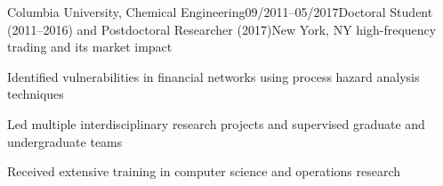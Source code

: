 \begin{rSubsection}{Columbia University, Chemical Engineering}{09/2011--05/2017}{Doctoral Student (2011--2016) and Postdoctoral Researcher (2017)}{New York, NY}
high-frequency trading and its market impact
\item %
Identified 
vulnerabilities in financial networks
using process hazard analysis techniques
\item Led multiple  
interdisciplinary research projects and
supervised graduate and undergraduate teams 
\item Received extensive 
 training
in computer science and 
operations research
%
%
%
%

\end{rSubsection}
